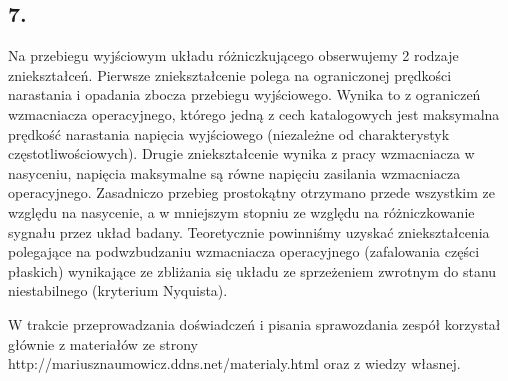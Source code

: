 \documentclass[polish,a4paper]{article}
\begin{document}
\subsection*{7.}
Na przebiegu wyjściowym układu różniczkującego obserwujemy 2 rodzaje zniekształceń. Pierwsze zniekształcenie polega na ograniczonej prędkości narastania i opadania zbocza przebiegu wyjściowego. Wynika to z ograniczeń wzmacniacza operacyjnego, którego jedną z cech katalogowych jest maksymalna prędkość narastania napięcia wyjściowego (niezależne od charakterystyk częstotliwościowych). Drugie zniekształcenie wynika z pracy wzmacniacza w nasyceniu, napięcia maksymalne są równe napięciu zasilania wzmacniacza operacyjnego. Zasadniczo przebieg prostokątny otrzymano przede wszystkim ze względu na nasycenie, a w mniejszym stopniu ze względu na różniczkowanie sygnału przez układ badany.
Teoretycznie powinniśmy uzyskać zniekształcenia polegające na podwzbudzaniu wzmacniacza operacyjnego (zafalowania części płaskich) wynikające ze zbliżania się układu ze sprzeżeniem zwrotnym do stanu niestabilnego (kryterium Nyquista).




\begin{thebibliography}{9}

  W trakcie przeprowadzania doświadczeń i pisania sprawozdania zespół korzystał głównie z materiałów ze strony http://mariusznaumowicz.ddns.net/materialy.html oraz z wiedzy własnej.\\


\end{thebibliography}
\end{document}
